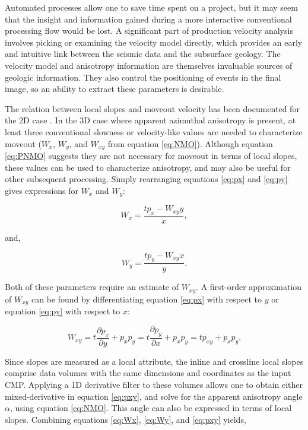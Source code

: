 Automated processes allow one to save time spent on a project, but it may seem that the insight and information gained during a more interactive conventional processing flow would be lost.  A significant part of production velocity analysis involves picking or examining the velocity model directly, which provides an early and intuitive link between the seismic data and the subsurface geology.  The velocity model and anisotropy information are themselves invaluable sources of geologic information.  They also control the positioning of events in the final image, so an ability to extract these parameters is desirable.

The relation between local slopes and moveout velocity has been documented for the 2D case \cite[]{Ottolini.sep.37.59, SEG-2004-24232426, fomel07}.  In the 3D case where apparent azimuthal anisotropy is present, at least three conventional slowness or velocity-like values are needed to characterize moveout ($W_x$, $W_y$, and $W_{xy}$ from equation \ref{eq:NMO}).  Although equation \ref{eq:PNMO} suggests they are not necessary for moveout in terms of local slopes, these values can be used to characterize anisotropy, and may also be useful for other subsequent processing. Simply rearranging equations \ref{eq:px} and \ref{eq:py} gives expressions for $W_x$ and $W_y$: 

\begin{equation}
\label{eq:Wx}
W_x=\frac{tp_x-W_{xy}y}{x},
\end{equation}

\noindent and,

\begin{equation}
\label{eq:Wy}
W_y=\frac{tp_y-W_{xy}x}{y}.
\end{equation}

\noindent Both of these parameters require an estimate of $W_{xy}$.  A first-order approximation of $W_{xy}$ can be found by differentiating equation \ref{eq:px} with respect to $y$ or equation \ref{eq:py} with respect to $x$:

\begin{equation}
\label{eq:pxy}
W_{xy}=t\frac{\partial p_x}{\partial y}+p_xp_y=t\frac{\partial p_y}{\partial x}+p_xp_y=tp_{xy}+p_xp_y.
\end{equation}

\noindent Since slopes are measured as a local attribute, the inline and crossline local slopes comprise data volumes with the same dimensions and coordinates as the input CMP.  Applying a 1D derivative filter to these volumes allows one to obtain either mixed-derivative in equation \ref{eq:pxy}, and solve for the apparent anisotropy angle $\alpha $, using equation \ref{eq:NMO}.  This angle can also be expressed in terms of local slopes. Combining equations \ref{eq:Wx}, \ref{eq:Wy}, and \ref{eq:pxy} yields,

